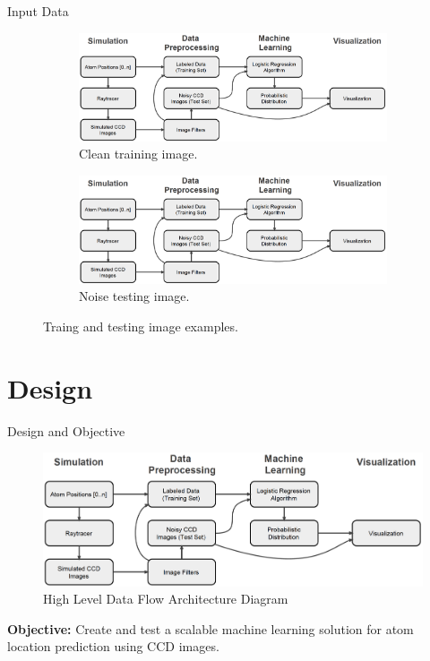 \documentclass{beamer}
\begin{document}
\begin{frame}{Input Data}


\begin{figure}
\centering
\begin{subfigure}{.5\textwidth}
  \centering
  \includegraphics[scale=0.4]{arch.png}
  \caption{Clean training image.}
  \label{fig:sub1}
\end{subfigure}%
\begin{subfigure}{.5\textwidth}
  \centering
  \includegraphics[scale=0.4]{arch.png}
  \caption{Noise testing image.}
  \label{fig:sub2}
\end{subfigure}
\caption{Traing and testing image examples.}
\label{fig:test}
\end{figure}

\end{frame}

\section{Design}

\begin{frame}{Design and Objective}

\begin{figure}[h]
\begin{center}
\includegraphics[scale=0.32]{arch.png}
\caption{High Level Data Flow Architecture Diagram}
\label{fig:small}
\end{center}
\end{figure}

\textbf{Objective:} Create and test a scalable machine learning solution for atom location prediction using CCD images.

\end{frame}
\end{document}
